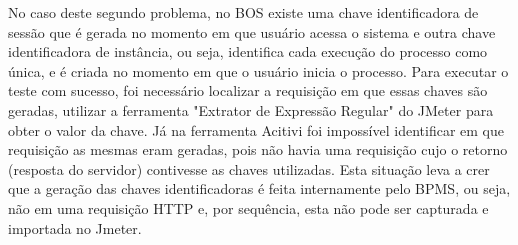 \documentclass[12pt]{article}
\begin{document}
No caso deste segundo problema, no BOS existe uma chave identificadora de sessão que é gerada no momento em que usuário acessa o sistema e outra chave identificadora de instância, ou seja, identifica cada execução do processo como única, e é criada no momento em que o usuário inicia o processo. Para executar o teste com sucesso, foi necessário localizar a requisição em que essas chaves são geradas, utilizar a ferramenta "Extrator de Expressão Regular" do JMeter para obter o valor da chave. Já na ferramenta Acitivi foi impossível identificar em que requisição as mesmas eram geradas, pois não havia uma requisição cujo o retorno (resposta do servidor) contivesse as chaves utilizadas. Esta situação leva a crer que a geração das chaves identificadoras é feita internamente pelo BPMS, ou seja, não em uma requisição HTTP e, por sequência, esta não pode ser capturada e importada no Jmeter.


\end{document}
